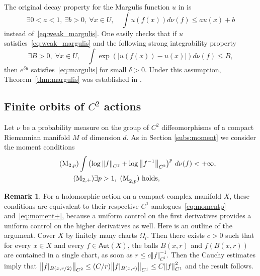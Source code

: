\documentclass[11pt]{article}
\newcommand{\norm}[1]{{\left\Vert#1\right\Vert}}
\newcommand{\abs}[1]{\left\vert#1\right\vert}
\newcommand{\rest}[1]{ \arrowvert_{#1}}
\newcommand{\lrpar}[1]{\left(#1\right)}
\newcommand{\inv}{^{-1}}
\newcommand\Aut{\mathsf{Aut}}
\theoremstyle{plain}
\theoremstyle{definition}
\newtheorem{rem}[thm]{Remark}
\numberwithin{equation}{section}
\begin{document}
The original decay property for the Margulis function $u$ in
\cite{eskin-margulis, benoist-quint3}
is
\begin{equation}
\label{eq:margulis}
\exists 0<a<1, \ \exists b>0, \ \forall x\in U, \quad \int u(f(x))d\nu(f) \leq au(x) +b
\end{equation}
instead of~\eqref{eq:weak_margulis}. One easily checks that if $u$ satisfies~\eqref{eq:weak_margulis} and the following strong integrability property
\begin{equation}
\label{eq:margulis_moment_exp}
\exists B>0,\; \forall x\in U, \quad \int \exp\lrpar{\abs{u(f(x)) - u(x) } }d\nu(f) \leq B,
\end{equation}
then $e^{\delta u}$
satisfies~\eqref{eq:margulis} for small $\delta>0$. Under this assumption, Theorem~\ref{thm:margulis} was established in
\cite{benoist-quint3}.

\subsection{Finite orbits of $C^2$ actions}\label{par:finite-orbits-C2-actions}
Let $\nu$ be a probability measure on the group of $C^2$ diffeomorphisms of a compact Riemannian
manifold $M$ of dimension $d$.
As in Section \ref{subs:moment} we consider the moment conditions
\begin{align}
\label{eq:moment2p}
\tag{M$_{2, p}$}
\int \lrpar{ \log\norm{f}_{C^2 }+ \log\norm{f\inv}_{C^2 }} ^p \, d\nu (f) < + \infty, \\
\label{eq:moment2+}
\tag{M$_{2, +}$}
\exists p>1, \ \mathrm{(M}_{2,p}\mathrm{)} \text{ holds}, \quad \quad \quad\quad \quad \quad \quad\quad
\end{align}
\begin{rem}\label{rem:moment-condition-holo}
For a holomorphic action on a compact
complex manifold $X$, these conditions are equivalent to their respective
$C^1$ analogues~\eqref{eq:momentp} and~\eqref{eq:moment+}, because a uniform control on the first derivatives provides a uniform control on the higher derivatives as well.
Here is an outline of the argument.
Cover $X$ by finitely many charts $\Omega_i$.
Then there exists $c>0$ such that for every $x\in X$ and every $f\in \Aut(X)$, the balls
$B(x,r)$ and $f(B(x,r))$
are contained in a single chart, as soon as $r \leq c \norm{f}_{C^1}\inv$. Then the
Cauchy estimates imply that $\norm{f\rest{B(x, r/2)}}_{C^2}\leq (C/r) \norm{f\rest{B(x, r)}}_{C^1} \leq C \norm{f}_{C^1}^2$ and the result follows.
\end{rem}
\end{document}
